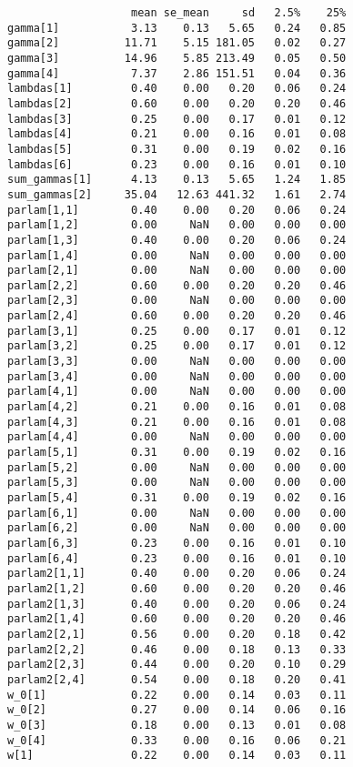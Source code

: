 \documentclass[
  12pt,
]{book}
\begin{document}
\begin{verbatim}
                   mean se_mean     sd   2.5%    25%
gamma[1]           3.13    0.13   5.65   0.24   0.85
gamma[2]          11.71    5.15 181.05   0.02   0.27
gamma[3]          14.96    5.85 213.49   0.05   0.50
gamma[4]           7.37    2.86 151.51   0.04   0.36
lambdas[1]         0.40    0.00   0.20   0.06   0.24
lambdas[2]         0.60    0.00   0.20   0.20   0.46
lambdas[3]         0.25    0.00   0.17   0.01   0.12
lambdas[4]         0.21    0.00   0.16   0.01   0.08
lambdas[5]         0.31    0.00   0.19   0.02   0.16
lambdas[6]         0.23    0.00   0.16   0.01   0.10
sum_gammas[1]      4.13    0.13   5.65   1.24   1.85
sum_gammas[2]     35.04   12.63 441.32   1.61   2.74
parlam[1,1]        0.40    0.00   0.20   0.06   0.24
parlam[1,2]        0.00     NaN   0.00   0.00   0.00
parlam[1,3]        0.40    0.00   0.20   0.06   0.24
parlam[1,4]        0.00     NaN   0.00   0.00   0.00
parlam[2,1]        0.00     NaN   0.00   0.00   0.00
parlam[2,2]        0.60    0.00   0.20   0.20   0.46
parlam[2,3]        0.00     NaN   0.00   0.00   0.00
parlam[2,4]        0.60    0.00   0.20   0.20   0.46
parlam[3,1]        0.25    0.00   0.17   0.01   0.12
parlam[3,2]        0.25    0.00   0.17   0.01   0.12
parlam[3,3]        0.00     NaN   0.00   0.00   0.00
parlam[3,4]        0.00     NaN   0.00   0.00   0.00
parlam[4,1]        0.00     NaN   0.00   0.00   0.00
parlam[4,2]        0.21    0.00   0.16   0.01   0.08
parlam[4,3]        0.21    0.00   0.16   0.01   0.08
parlam[4,4]        0.00     NaN   0.00   0.00   0.00
parlam[5,1]        0.31    0.00   0.19   0.02   0.16
parlam[5,2]        0.00     NaN   0.00   0.00   0.00
parlam[5,3]        0.00     NaN   0.00   0.00   0.00
parlam[5,4]        0.31    0.00   0.19   0.02   0.16
parlam[6,1]        0.00     NaN   0.00   0.00   0.00
parlam[6,2]        0.00     NaN   0.00   0.00   0.00
parlam[6,3]        0.23    0.00   0.16   0.01   0.10
parlam[6,4]        0.23    0.00   0.16   0.01   0.10
parlam2[1,1]       0.40    0.00   0.20   0.06   0.24
parlam2[1,2]       0.60    0.00   0.20   0.20   0.46
parlam2[1,3]       0.40    0.00   0.20   0.06   0.24
parlam2[1,4]       0.60    0.00   0.20   0.20   0.46
parlam2[2,1]       0.56    0.00   0.20   0.18   0.42
parlam2[2,2]       0.46    0.00   0.18   0.13   0.33
parlam2[2,3]       0.44    0.00   0.20   0.10   0.29
parlam2[2,4]       0.54    0.00   0.18   0.20   0.41
w_0[1]             0.22    0.00   0.14   0.03   0.11
w_0[2]             0.27    0.00   0.14   0.06   0.16
w_0[3]             0.18    0.00   0.13   0.01   0.08
w_0[4]             0.33    0.00   0.16   0.06   0.21
w[1]               0.22    0.00   0.14   0.03   0.11

\end{verbatim}
\end{document}
